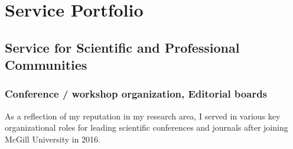 \chapter{Service Portfolio}

\section{Service for Scientific and Professional Communities}



\subsection{Conference / workshop organization, Editorial boards}

As a reflection of my reputation in my research area, I served in various key organizational roles for leading scientific conferences and journals after joining McGill University in 2016. 

